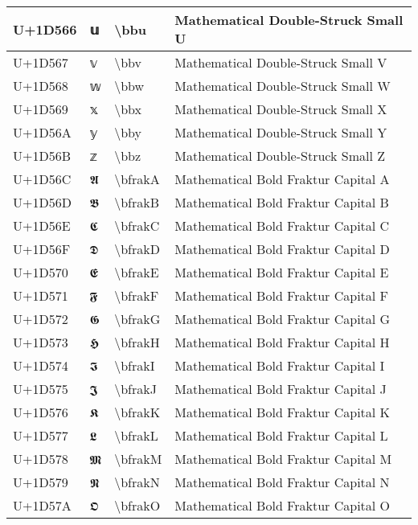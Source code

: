 \begin{table}[h]
\begin{tabulary}{\linewidth}{|L|L|L|L|}
\hline
U+1D566 & 𝕦 & {\textbackslash}bbu & Mathematical Double-Struck Small U \\
\hline
U+1D567 & 𝕧 & {\textbackslash}bbv & Mathematical Double-Struck Small V \\
\hline
U+1D568 & 𝕨 & {\textbackslash}bbw & Mathematical Double-Struck Small W \\
\hline
U+1D569 & 𝕩 & {\textbackslash}bbx & Mathematical Double-Struck Small X \\
\hline
U+1D56A & 𝕪 & {\textbackslash}bby & Mathematical Double-Struck Small Y \\
\hline
U+1D56B & 𝕫 & {\textbackslash}bbz & Mathematical Double-Struck Small Z \\
\hline
U+1D56C & 𝕬 & {\textbackslash}bfrakA & Mathematical Bold Fraktur Capital A \\
\hline
U+1D56D & 𝕭 & {\textbackslash}bfrakB & Mathematical Bold Fraktur Capital B \\
\hline
U+1D56E & 𝕮 & {\textbackslash}bfrakC & Mathematical Bold Fraktur Capital C \\
\hline
U+1D56F & 𝕯 & {\textbackslash}bfrakD & Mathematical Bold Fraktur Capital D \\
\hline
U+1D570 & 𝕰 & {\textbackslash}bfrakE & Mathematical Bold Fraktur Capital E \\
\hline
U+1D571 & 𝕱 & {\textbackslash}bfrakF & Mathematical Bold Fraktur Capital F \\
\hline
U+1D572 & 𝕲 & {\textbackslash}bfrakG & Mathematical Bold Fraktur Capital G \\
\hline
U+1D573 & 𝕳 & {\textbackslash}bfrakH & Mathematical Bold Fraktur Capital H \\
\hline
U+1D574 & 𝕴 & {\textbackslash}bfrakI & Mathematical Bold Fraktur Capital I \\
\hline
U+1D575 & 𝕵 & {\textbackslash}bfrakJ & Mathematical Bold Fraktur Capital J \\
\hline
U+1D576 & 𝕶 & {\textbackslash}bfrakK & Mathematical Bold Fraktur Capital K \\
\hline
U+1D577 & 𝕷 & {\textbackslash}bfrakL & Mathematical Bold Fraktur Capital L \\
\hline
U+1D578 & 𝕸 & {\textbackslash}bfrakM & Mathematical Bold Fraktur Capital M \\
\hline
U+1D579 & 𝕹 & {\textbackslash}bfrakN & Mathematical Bold Fraktur Capital N \\
\hline
U+1D57A & 𝕺 & {\textbackslash}bfrakO & Mathematical Bold Fraktur Capital O \\

\end{tabulary}
\end{table}

